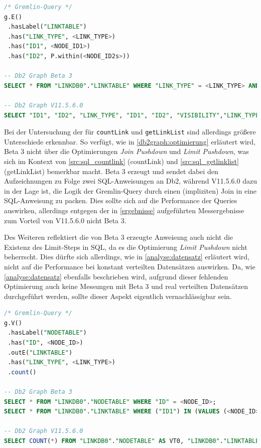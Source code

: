 \begin{lstlisting}[caption={Generierter SQL-Code getLink},label=src:sql_getlink,language=SQL]
/* Gremlin-Query */
g.E()
 .hasLabel("LINKTABLE")
 .has("LINK_TYPE", <LINK_TYPE>)
 .has("ID1", <NODE_ID1>)
 .has("ID2", P.within(<NODE_ID2s>))

-- Db2 Graph Beta 3
SELECT * FROM "LINKDB0"."LINKTABLE" WHERE "LINK_TYPE" = <LINK_TYPE> AND "ID1" = <NODE_ID1> AND "ID2" IN (VALUES <NODE_ID2_0>, <NODE_ID2_1>, <...>);

-- Db2 Graph V11.5.6.0
SELECT "ID1", "ID2", "LINK_TYPE", "ID1", "ID2", "VISIBILITY","LINK_TYPE", "DATA", "ID2", "ID1", "VERSION", "TIME" FROM "LINKDB0"."LINKTABLE" WHERE "LINK_TYPE" = <LINK_TYPE> AND "ID1" = <NODE_ID1> AND "ID2" IN (VALUES <NODE_ID2_0>, <NODE_ID2_1>, <...>);
\end{lstlisting}

Bei der Untersuchung der für \texttt{countLink} und \texttt{getLinkList} sind allerdings größere Unterschiede erkennbar. So verfügt, wie in \autoref{db2graph:optimierung} erläutert wird, Beta 3 nicht über die Optimierungen \textit{Join Pushdown} und \textit{Limit Pushdown}, was sich im Kontext von \autoref{src:sql_countlink} (countLink) und \autoref{src:sql_getlinklist} (getLinkList) bemerkbar macht. Beta 3 erzeugt und sendet dabei den Aufzeichnungen zu Folge zwei SQL-Anweisungen an Db2, während V11.5.6.0 dazu in der Lage ist, die Logik der Gremlin-Query durch einen (impliziten) Join in eine SQL-Anweisung zu packen. Dies sollte sich auf die Performance der Queries auswirken, allerdings entgegen der in \autoref{ergebnisse} aufgeführten Messergebnisse zum Vorteil von V11.5.6.0 nicht Beta 3. 

Des Weiteren reflektiert die von Beta 3 erzeugte Anweisung auch nicht die Existenz des Limit-Steps in SQL, da es die Optimierung \textit{Limit Pushdown} nicht beherrscht. Dies dürfte sich allerdings, wie in \autoref{analyse:datensatz} erläutert wird, nicht auf die Performance bei konstant verteilten Datensätzen auswirken. Da, wie \autoref{analyse:datensatz} ebenfalls beschrieben wird, aufgrund dieser fehlenden Optimierung auch keine Messungen mit Beta 3 und real verteilten Datensätzen durchgeführt werden, sollte dieser Aspekt eigentlich vernachlässigbar sein. 
\begin{lstlisting}[caption={Generierter SQL-Code countLink},label=src:sql_countlink,language=SQL]
/* Gremlin-Query */
g.V()
 .hasLabel("NODETABLE")
 .has("ID", <NODE_ID>)
 .outE("LINKTABLE")
 .has("LINK_TYPE", <LINK_TYPE>)
 .count()

-- Db2 Graph Beta 3
SELECT * FROM "LINKDB0"."NODETABLE" WHERE "ID" = <NODE_ID>;
SELECT * FROM "LINKDB0"."LINKTABLE" WHERE ("ID1") IN (VALUES (<NODE_ID>)) AND "LINK_TYPE" = <LINK_TYPE>;

-- Db2 Graph V11.5.6.0
SELECT COUNT(*) FROM "LINKDB0"."NODETABLE" AS VT0, "LINKDB0"."LINKTABLE" AS ET1 WHERE VT0."ID" = <NODE_ID> AND ET1."LINK_TYPE" = <LINK_TYPE> AND VT0.ID = ET1.ID1
\end{lstlisting}

